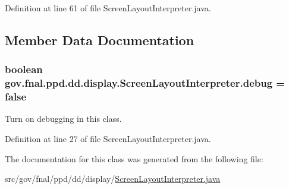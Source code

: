 Definition at line 61 of file Screen\-Layout\-Interpreter.\-java.



\subsection{Member Data Documentation}
\hypertarget{classgov_1_1fnal_1_1ppd_1_1dd_1_1display_1_1ScreenLayoutInterpreter_aa00d08475435546dab252b31c72e982d}{
\subsubsection[{debug}]{\setlength{\rightskip}{0pt plus 5cm}boolean gov.\-fnal.\-ppd.\-dd.\-display.\-Screen\-Layout\-Interpreter.\-debug = false\hspace{0.3cm}{\ttfamily [static]}}}\label{classgov_1_1fnal_1_1ppd_1_1dd_1_1display_1_1ScreenLayoutInterpreter_aa00d08475435546dab252b31c72e982d}


Turn on debugging in this class. 



Definition at line 27 of file Screen\-Layout\-Interpreter.\-java.



The documentation for this class was generated from the following file\-:\begin{DoxyCompactItemize}
\item 
src/gov/fnal/ppd/dd/display/\hyperlink{ScreenLayoutInterpreter_8java}{Screen\-Layout\-Interpreter.\-java}\end{DoxyCompactItemize}
